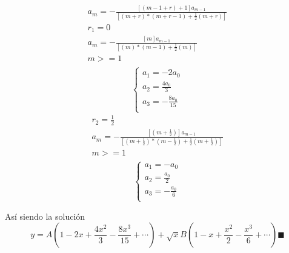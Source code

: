 \begin{mdframed}
\begin{equation}
    \end{equation}
    \begin{gather*}
        a_m=- \frac{[({m-1+r}) + 1]a_{m-1}}{[({m+r})*({m+r-1})+\frac{1}{2}({m+r}) ]}\\
        r_1 =0\\
        a_m=- \frac{[m]a_{m-1}}{[({m})*({m-1})+\frac{1}{2}({m})]}\\
        m >=1\\
\end{gather*}
  \begin{equation}
    \begin{cases}
        a_1=-{2a_0}\\
        a_2=\frac{4a_0}{3}\\
        a_3=-\frac{8a_0}{15}\\
    \end{cases}
\end{equation}
\begin{gather*}
    r_2 = \frac{1}{2}\\
    a_m=- \frac{[({m+\frac{1}{2}})]a_{m-1}}{[({m+\frac{1}{2}})*({m-\frac{1}{2}})+\frac{1}{2}({m+\frac{1}{2}}) ]}\\
    m >=1\\
\end{gather*}
  \begin{equation}
    \begin{cases}
        a_1=-{a_0}\\
        a_2=\frac{a_0}{2}\\
        a_3=-\frac{a_0}{6}\\
    \end{cases}
\end{equation}

Así siendo la solución
$$y = A(1-2x+\frac{4x^2}{3}-\frac{8x^3}{15}+\cdots)+\sqrt{x}B(1-x+\frac{x^2}{2}-\frac{x^3}{6}+\cdots) \blacksquare$$
\end{mdframed}

